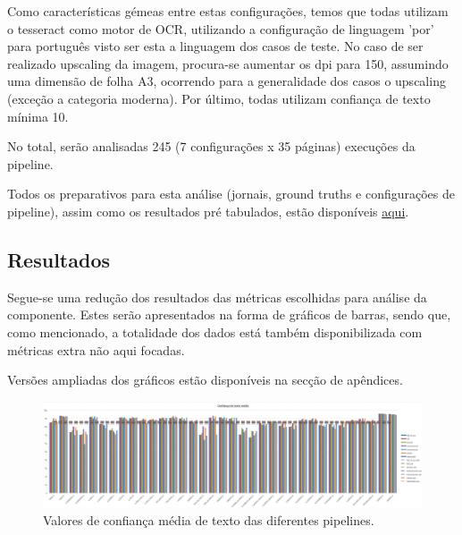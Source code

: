Como características gémeas entre estas configurações, temos que todas utilizam o tesseract como motor de OCR, utilizando a configuração de linguagem 'por' para português visto ser esta a linguagem dos casos de teste. No caso de ser realizado upscaling da imagem, procura-se aumentar os dpi para 150, assumindo uma dimensão de folha A3, ocorrendo para a generalidade dos casos o upscaling (exceção a categoria moderna). Por último, todas utilizam confiança de texto mínima 10.

No total, serão analisadas 245 (7 configurações x 35 páginas) execuções da pipeline.



Todos os preparativos para esta análise (jornais, ground truths e configurações de pipeline), assim como os resultados pré tabulados, estão disponíveis \href{https://drive.google.com/drive/u/0/folders/1DW-AIuSxjEyv6ioq7jX8P1xruy03Sxo9}{aqui}.


\subsection{Resultados}

Segue-se uma redução dos resultados das métricas escolhidas para análise da componente. Estes serão apresentados na forma de gráficos de barras, sendo que, como mencionado, a totalidade dos dados está também disponibilizada com métricas extra não aqui focadas.

Versões ampliadas dos gráficos estão disponíveis na secção de apêndices.

\begin{figure}[H]
	\centering
	\hspace*{-2cm}
	\includegraphics[width=1.2\textwidth]{images/resultados/graph_avg_text_conf.png}
	\caption{Valores de confiança média de texto das diferentes pipelines.}
	\label{fig:graph_avg_text_conf}
\end{figure}


